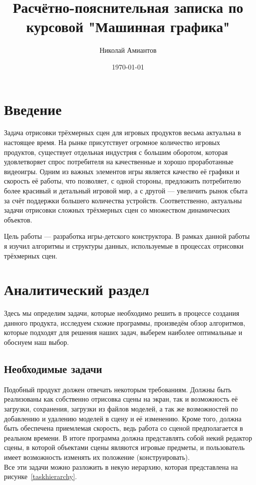 \documentclass[a4paper,12pt]{report}
\title{Расчётно-пояснительная записка по курсовой "Машинная графика"}
\author{Николай Амиантов}
\date{\today}
\numberwithin{equation}{section}
\begin{document}
\maketitle

\section*{Введение}
Задача отрисовки трёхмерных сцен для игровых продуктов весьма актуальна в настоящее время. На рынке присутствует огромное количество игровых продуктов, существует отдельная индустрия с большим оборотом, которая удовлетворяет спрос потребителя на качественные и хорошо проработанные видеоигры. Одним из важных элементов игры является качество её графики и скорость её работы, что позволяет, с одной стороны, предложить потребителю более красивый и детальный игровой мир, а с другой --- увеличить рынок сбыта за счёт поддержки большего количества устройств. Соответственно, актуальны задачи отрисовки сложных трёхмерных сцен со множеством динамических объектов.

Цель работы --- разработка игры-детского конструктора. В рамках данной работы я изучил алгоритмы и структуры данных, используемые в процессах отрисовки трёхмерных сцен.

\section{Аналитический раздел}
Здесь мы определим задачи, которые необходимо решить в процессе создания данного продукта, исследуем схожие программы, произведём обзор алгоритмов, которые подходят для решения наших задач, выберем наиболее оптимальные и обоснуем наш выбор.

\subsection{Необходимые задачи}
Подобный продукт должен отвечать некоторым требованиям. Должны быть реализованы как собственно отрисовка сцены на экран, так и возможность её загрузки, сохранения, загрузки из файлов моделей, а так же возможностей по добавлению и удалению моделей в сцену и её изменению. Кроме того, должна быть обеспечена приемлемая скорость, ведь работа со сценой предполагается в реальном времени. В итоге программа должна представлять собой некий редактор сцены, в которой объектами сцены являются игровые предметы, и пользователь имеет возможность изменять их положение (конструировать).  \\
Все эти задачи можно разложить в некую иерархию, которая представлена на рисунке~\ref{taskhierarchy}.
\end{document}
